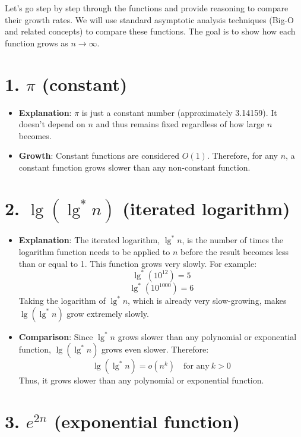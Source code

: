 \documentclass{article}
\begin{document}
Let's go step by step through the functions and provide reasoning to compare their growth rates. We will use standard asymptotic analysis techniques (Big-O and related concepts) to compare these functions. The goal is to show how each function grows as \( n \to \infty \).

\section{1. \( \pi \) (constant)}

\begin{itemize}
    \item \textbf{Explanation}: \( \pi \) is just a constant number (approximately 3.14159). It doesn’t depend on \( n \) and thus remains fixed regardless of how large \( n \) becomes.
    \item \textbf{Growth}: Constant functions are considered \( O(1) \). Therefore, for any \( n \), a constant function grows slower than any non-constant function.
\end{itemize}

\section{2. \( \lg(\lg^*n) \) (iterated logarithm)}

\begin{itemize}
    \item \textbf{Explanation}: The iterated logarithm, \( \lg^*n \), is the number of times the logarithm function needs to be applied to \( n \) before the result becomes less than or equal to 1. This function grows very slowly. For example:
    \[
    \lg^*(10^{12}) = 5
    \]
    \[
    \lg^*(10^{1000}) = 6
    \]
    Taking the logarithm of \( \lg^*n \), which is already very slow-growing, makes \( \lg(\lg^*n) \) grow extremely slowly.
    
    \item \textbf{Comparison}: Since \( \lg^*n \) grows slower than any polynomial or exponential function, \( \lg(\lg^*n) \) grows even slower. Therefore:
    \[
    \lg(\lg^*n) = o(n^k) \quad \text{for any} \ k > 0
    \]
    Thus, it grows slower than any polynomial or exponential function.
\end{itemize}

\section{3. \( e^{2n} \) (exponential function)}
\end{document}
